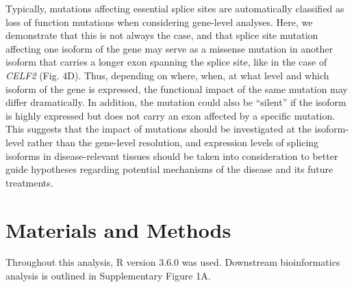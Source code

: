 \documentclass[12pt,chapterheads,final]{ucsd}
\begin{document}
Typically, mutations affecting essential splice sites are automatically classified as loss of function mutations when considering gene-level analyses. Here, we demonstrate that this is not always the case, and that splice site mutation affecting one isoform of the gene may serve as a missense mutation in another isoform that carries a longer exon spanning the splice site, like in the case of \textit{CELF2} (Fig. 4D). Thus, depending on where, when, at what level and which isoform of the gene is expressed, the functional impact of the same mutation may differ dramatically. In addition, the mutation could also be “silent” if the isoform is highly expressed but does not carry an exon affected by a specific mutation. This suggests that the impact of mutations should be investigated at the isoform-level rather than the gene-level resolution, and expression levels of splicing isoforms in disease-relevant tissues should be taken into consideration to better guide hypotheses regarding potential mechanisms of the disease and its future treatments. \par

\chapter{Materials and Methods}
Throughout this analysis, R version 3.6.0 was used. Downstream bioinformatics analysis is outlined in Supplementary Figure 1A.
\end{document}
